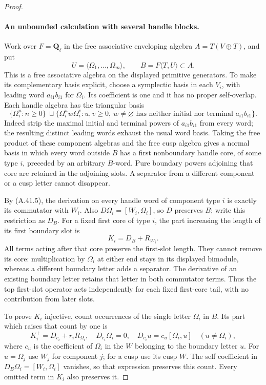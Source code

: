 \begin{proof}
\paragraph{An unbounded calculation with several handle blocks.}
Work over \(F=\mathbf Q_\ell\) in the free associative
enveloping algebra \(A=T(V\oplus T)\), and put
\[
             U=\langle\Omega_1,\ldots,\Omega_m\rangle,
             \qquad B=F\langle T,U\rangle\subset A.
                                                               \tag{A.41.7}
\]
This is a free associative algebra on the displayed
primitive generators. To make its complementary basis
explicit, choose a symplectic basis in each \(V_i\),
with leading word \(a_{i1}b_{i1}\) for \(\Omega_i\).
Its coefficient is one and it has no proper self-overlap.
Each handle algebra has the triangular basis
\[
 \{\Omega_i^n:n\ge0\}\ \sqcup
 \{\Omega_i^u w\Omega_i^v:u,v\ge0,
   \ w\ne\varnothing\text{ has neither initial nor terminal }
                                      a_{i1}b_{i1}\}.           \tag{A.41.8}
\]
Indeed strip the maximal initial and terminal powers of
\(a_{i1}b_{i1}\) from every word; the resulting distinct
leading words exhaust the usual word basis. Taking the
free product of these component algebras and the free
cusp algebra gives a normal basis in which every word
outside \(B\) has a first nonboundary handle core,
of some type \(i\), preceded by an arbitrary \(B\)-word.
Pure boundary powers adjoining that core are retained
in the adjoining slots. A separator from a different
component or a cusp letter cannot disappear.

By (A.41.5), the derivation on every handle word of
component type \(i\) is exactly its commutator with
\(W_i\). Also
\(D\Omega_i=[W_i,\Omega_i]\), so \(D\) preserves
\(B\); write this restriction as \(D_B\). For a
fixed first core of type \(i\), the part increasing
the length of its first boundary slot is
\[
                             K_i=D_B+R_{W_i}.        \tag{A.41.9}
\]
All terms acting after that core preserve the first-slot
length. They cannot remove its core: multiplication by
\(\Omega_i\) at either end stays in its displayed
bimodule, whereas a different boundary letter adds a
separator. The derivative of an existing boundary letter
retains that letter in both commutator terms. Thus the
top first-slot operator acts independently for each fixed
first-core tail, with no contribution from later slots.

To prove \(K_i\) injective, count occurrences of the
single letter \(\Omega_i\) in \(B\). Its part which
raises that count by one is
\[
                K_i^+=D_{c_i}+r_iR_{\Omega_i},
 \quad D_{c_i}\Omega_i=0,
 \quad D_{c_i}u=c_u[\Omega_i,u]\quad(u\ne\Omega_i), 
                                                               \tag{A.41.10}
\]
where \(c_u\) is the coefficient of \(\Omega_i\)
in the \(W\) belonging to the boundary letter \(u\).
For \(u=\Omega_j\) use \(W_j\) for component \(j\);
for a cusp use its cusp \(W\). The self coefficient
in \(D_B\Omega_i=[W_i,\Omega_i]\) vanishes, so
that expression preserves this count. Every omitted
term in \(K_i\) also preserves it.


\end{proof}
